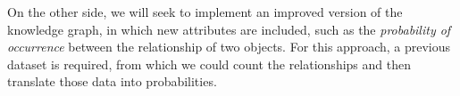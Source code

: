 On the other side, we will seek to implement an improved version of the 
knowledge graph, in which new attributes are included, such as the 
\textit{probability of occurrence} between the relationship of two objects. 
For this approach, a previous dataset is required, from which we could count 
the relationships and then translate those data into probabilities.



